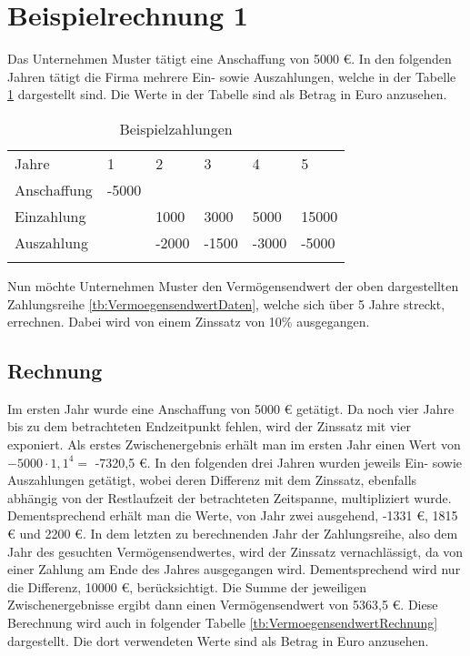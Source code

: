 \section{Beispielrechnung 1}

Das Unternehmen Muster tätigt eine Anschaffung von 5000 €. In den folgenden Jahren tätigt die Firma mehrere Ein- sowie Auszahlungen, welche in der Tabelle \ref{tb:VermoegensendwertDaten} dargestellt sind. Die Werte in der Tabelle sind als Betrag in Euro anzusehen.

\bigskip

\begin{table}[!h]
    \begin{tabular}{llllll}
        \cline{1-6} \rowcolor{gray}
        Jahre       & 1     & 2     & 3     & 4     & 5     \\ \cline{1-6} \rowcolor{white}
        Anschaffung & -5000 &       &       &       &       \\ \cline{1-6} \rowcolor{white}
        Einzahlung  &       & 1000  & 3000  & 5000  & 15000 \\ \cline{1-6} \rowcolor{white}
        Auszahlung  &       & -2000 & -1500 & -3000 & -5000 \\ \cline{1-6} \rowcolor{white}
    \end{tabular}
    \caption{Beispielzahlungen}
    \label{tb:VermoegensendwertDaten}
\end{table}

\bigskip
\noindent
Nun möchte Unternehmen Muster den Vermögensendwert der oben dargestellten Zahlungsreihe \eqref{tb:VermoegensendwertDaten}, welche sich über 5 Jahre streckt, errechnen. Dabei wird von einem Zinssatz von 10\% ausgegangen.
\subsection{Rechnung}

Im ersten Jahr wurde eine Anschaffung von 5000 € getätigt. Da noch vier Jahre bis zu dem betrachteten Endzeitpunkt fehlen, wird der Zinssatz mit vier exponiert. Als erstes Zwischenergebnis erhält man im ersten Jahr einen Wert von $-5000 \cdot 1,1^4 =$ -7320,5 €. In den folgenden drei Jahren wurden jeweils Ein- sowie Auszahlungen getätigt, wobei deren Differenz mit dem Zinssatz, ebenfalls abhängig von der Restlaufzeit der betrachteten Zeitspanne, multipliziert wurde. Dementsprechend erhält man die Werte, von Jahr zwei ausgehend, -1331 €, 1815 € und 2200 €. In dem letzten zu berechnenden Jahr der Zahlungsreihe, also dem Jahr des gesuchten Vermögensendwertes, wird der Zinssatz vernachlässigt, da von einer Zahlung am Ende des Jahres ausgegangen wird. Dementsprechend wird nur die Differenz, 10000 €, berücksichtigt. Die Summe der jeweiligen Zwischenergebnisse ergibt dann einen Vermögensendwert von 5363,5 €. Diese Berechnung wird auch in folgender Tabelle \ref{tb:VermoegensendwertRechnung} dargestellt. Die dort verwendeten Werte sind als Betrag in Euro anzusehen.

